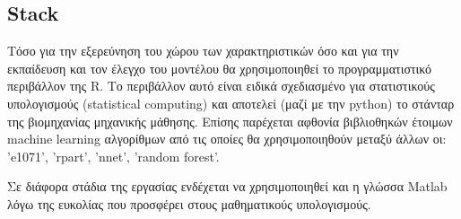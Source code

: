 \subsection{Stack}

Τόσο για την εξερεύνηση του χώρου των χαρακτηριστικών όσο και για την εκπαίδευση
και τον έλεγχο του μοντέλου θα χρησιμοποιηθεί το προγραμματιστικό περιβάλλον της
R. Το περιβάλλον αυτό είναι ειδικά σχεδιασμένο για στατιστικούς υπολογισμούς
(statistical computing) και αποτελεί (μαζί με την python) το στάνταρ της
βιομηχανίας μηχανικής μάθησης. Επίσης παρέχεται αφθονία βιβλιοθηκών έτοιμων
machine learning αλγορίθμων από τις οποίες θα χρησιμοποιηθούν μεταξύ άλλων οι:
'e1071', 'rpart', 'nnet', 'random forest'.

Σε διάφορα στάδια της εργασίας ενδέχεται να χρησιμοποιηθεί και η γλώσσα Matlab
λόγω της ευκολίας που προσφέρει στους μαθηματικούς υπολογισμούς.

